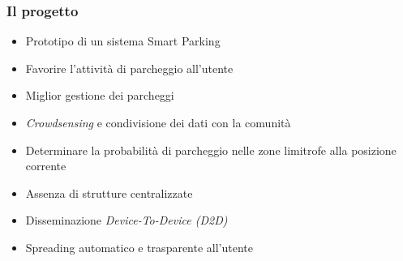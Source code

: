 \documentclass{beamer}
\begin{document}
\begin{frame}
  \frametitle{Il progetto}
  \begin{itemize}
    \item Prototipo di un sistema Smart Parking
    \item Favorire l'attività di parcheggio all'utente 
    \item Miglior gestione dei parcheggi 
    \item \textit{Crowdsensing} e condivisione dei dati con la comunità
    \item Determinare la probabilità di parcheggio nelle zone limitrofe alla posizione corrente
    \item Assenza di strutture centralizzate
    \item Disseminazione \textit{Device-To-Device (D2D)}
    \item Spreading automatico e trasparente all'utente
  \end{itemize}
\end{frame}
\end{document}
